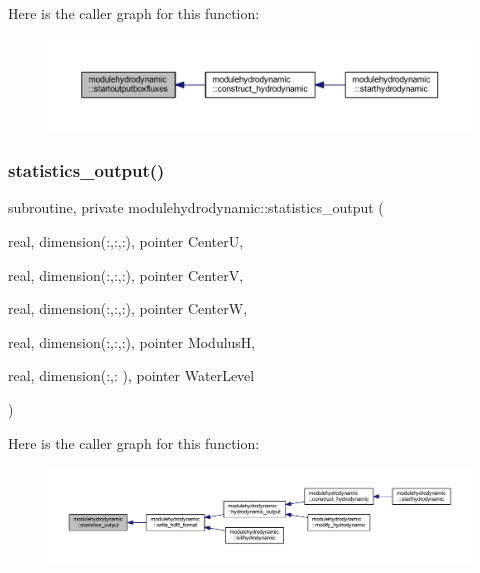 Here is the caller graph for this function\+:\nopagebreak
\begin{figure}[H]
\begin{center}
\leavevmode
\includegraphics[width=350pt]{namespacemodulehydrodynamic_ae7cd830108d9eacfb53fd458817db13d_icgraph}
\end{center}
\end{figure}
\mbox{\label{namespacemodulehydrodynamic_ab12f940af5dec2fe8ed4767b7a50fc07}} 
\subsubsection{\texorpdfstring{statistics\+\_\+output()}{statistics\_output()}}
{\footnotesize\ttfamily subroutine, private modulehydrodynamic\+::statistics\+\_\+output (\begin{DoxyParamCaption}\item[{real, dimension(\+:,\+:,\+:), pointer}]{CenterU,  }\item[{real, dimension(\+:,\+:,\+:), pointer}]{CenterV,  }\item[{real, dimension(\+:,\+:,\+:), pointer}]{CenterW,  }\item[{real, dimension(\+:,\+:,\+:), pointer}]{ModulusH,  }\item[{real, dimension(\+:,\+:  ), pointer}]{Water\+Level }\end{DoxyParamCaption})\hspace{0.3cm}{\ttfamily [private]}}

Here is the caller graph for this function\+:\nopagebreak
\begin{figure}[H]
\begin{center}
\leavevmode
\includegraphics[width=350pt]{namespacemodulehydrodynamic_ab12f940af5dec2fe8ed4767b7a50fc07_icgraph}
\end{center}
\end{figure}
\mbox{\label{namespacemodulehydrodynamic_a1d685e489f857af3dd0c69835d0b081d}} 
